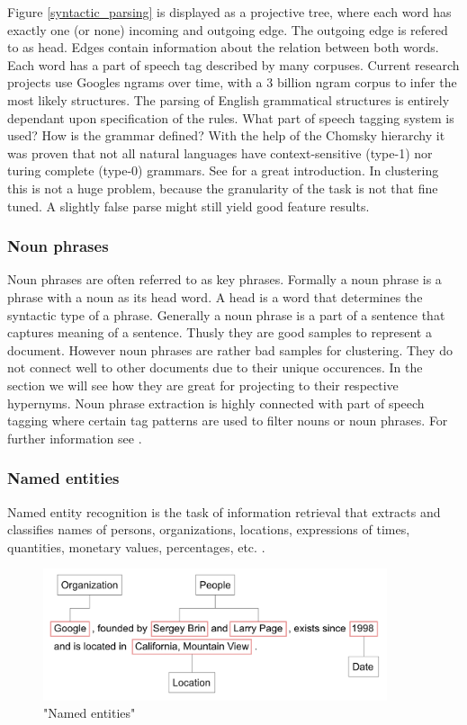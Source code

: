   Figure \ref{syntactic_parsing} is displayed as a projective tree, where each word has exactly one (or none) incoming and outgoing edge. The outgoing edge is refered to as head. Edges contain information about the relation between both words. Each word has a part of speech tag described by many corpuses. Current research projects use Googles ngrams over time, with a 3 billion ngram corpus to infer the most likely structures. \cite{SyntacticNgramsOverTime2013}
  The parsing of English grammatical structures is entirely dependant upon specification of the rules. What part of speech tagging system is used? How is the grammar defined? With the help of the Chomsky hierarchy it was proven that not all natural languages have context-sensitive (type-1) nor turing complete (type-0) grammars. See \cite[chp. 16]{NLPBookJurafsky2000} for a great introduction.
  In clustering this is not a huge problem, because the granularity of the task is not that fine tuned. A slightly false parse might still yield good feature results.

  \subsubsection*{Noun phrases}
  Noun phrases are often referred to as key phrases. Formally a noun phrase is a phrase with a noun as its head word. A head is a word that determines the syntactic type of a phrase. Generally a noun phrase is a part of a sentence that captures meaning of a sentence. Thusly they are good samples to represent a document. However noun phrases are rather bad samples for clustering. They do not connect well to other documents due to their unique occurences. In the \wordnet{} section we will see how they are great for projecting to their respective hypernyms. Noun phrase extraction is highly connected with part of speech tagging where certain tag patterns are used to filter nouns or noun phrases. For further information see \cite[chp. 5, 12]{NLPBookJurafsky2000}.

  \subsubsection*{Named entities}
  Named entity recognition is the task of information retrieval that extracts and classifies  names of persons, organizations, locations, expressions of times, quantities, monetary values, percentages, etc. \cite[chp. 22]{NLPBookJurafsky2000}. 

    \begin{figure}[h!]
      \centering
        \includegraphics[width=0.9\textwidth]{ner_tags.png}
        \caption{"Named entities"}
        \label{ner_tags}
    \end{figure} 

